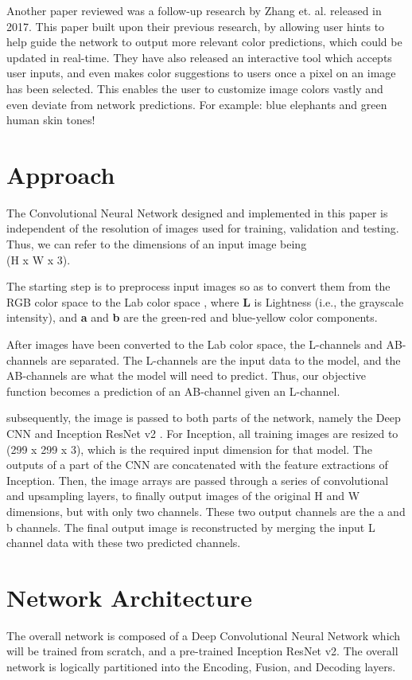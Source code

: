\documentclass[10pt,twocolumn,letterpaper]{article}
\begin{document}
	Another paper reviewed was a follow-up research by Zhang et. al. \cite{Zhang2} released in 2017. This paper built upon their previous research, by allowing user hints to help guide the network to output more relevant color predictions, which could be updated in real-time. They have also released an interactive tool which accepts user inputs, and even makes color suggestions to users once a pixel on an image has been selected. This enables the user to customize image colors vastly and even deviate from network predictions. For example: blue elephants and green human skin tones!

	\section{Approach}
	The Convolutional Neural Network designed and implemented in this paper is independent of the resolution of images used for training, validation and testing. Thus, we can refer to the dimensions of an input image being\\
	(H x W x 3).

	The starting step is to preprocess input images so as to convert them from the RGB color space to the Lab color space \cite{LabColorSpace}, where \textbf{L} is Lightness (i.e., the grayscale intensity), and \textbf{a} and \textbf{b} are the green-red and blue-yellow color components.

	After images have been converted to the Lab color space, the L-channels and AB-channels are separated. The L-channels are the input data to the model, and the AB-channels are what the model will need to predict. Thus, our objective function becomes a prediction of an AB-channel given an L-channel.

	subsequently, the image is passed to both parts of the network, namely the Deep CNN and Inception ResNet v2 \cite{Inception}. For Inception, all training images are resized to\\(299 x 299 x 3), which is the required input dimension for that model. The outputs of a part of the CNN are concatenated with the feature extractions of Inception. Then, the image arrays are passed through a series of convolutional and upsampling layers, to finally output images of the original H and W dimensions, but with only two channels. These two output channels are the a and b channels. The final output image is reconstructed by merging the input L channel data with these two predicted channels.

	\section{Network Architecture}
	The overall network is composed of a Deep Convolutional Neural Network which will be trained from scratch, and a pre-trained Inception ResNet v2. The overall network is logically partitioned into the Encoding, Fusion, and Decoding layers.
\end{document}
